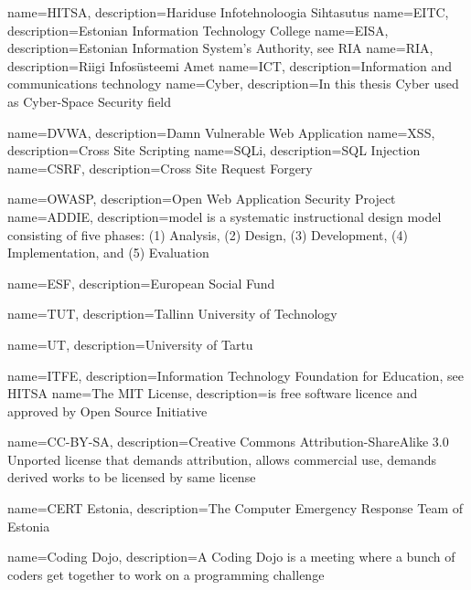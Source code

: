 {
  name=HITSA,
  description={Hariduse Infotehnoloogia Sihtasutus}
}
{
  name=EITC,
  description={Estonian Information Technology College}
}
{
  name=EISA,
  description={Estonian Information System’s Authority, see \gls{RIA}}
}
{
  name=RIA,
  description={Riigi Infosüsteemi Amet}
}
{
  name=ICT,
  description={Information and communications technology}
}
{
  name=Cyber,
  description={In this thesis Cyber used as Cyber-Space Security field}
}
 
{
  name=DVWA,
  description={Damn Vulnerable Web Application}
}
{
  name=XSS,
  description={Cross Site Scripting}
}
{
  name=SQLi,
  description={SQL Injection}
}
{
  name=CSRF,
  description={Cross Site Request Forgery}
}
 
{
  name=OWASP,
  description={Open Web Application Security Project}
}
{
  name=ADDIE,
  description={model is a systematic instructional design model consisting of five phases: (1) Analysis, (2) Design, (3) Development, (4) Implementation, and (5) Evaluation}
} 


{
  name=ESF,
  description={European Social Fund}
} 


{
  name=TUT,
  description={Tallinn University of Technology}
} 


{
  name=UT,
  description={University of Tartu}
} 


{
  name=ITFE,
  description={Information Technology Foundation for Education, see \gls{HITSA}}
} 
{
  name=The MIT License,
  description={is free software licence and approved by Open Source Initiative}
} 


{
  name=CC-BY-SA,
  description={Creative Commons Attribution-ShareAlike 3.0 Unported license that demands attribution, allows commercial use, demands derived works to be licensed by same license}
} 


{
  name=CERT Estonia,
  description={The Computer Emergency Response Team of Estonia}
}

{
  name=Coding Dojo,
  description={A Coding Dojo is a meeting where a bunch of coders get together to work on a programming challenge}
}


